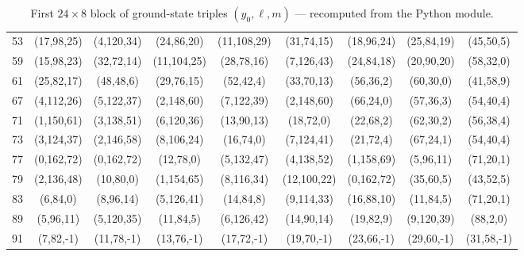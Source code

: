 \documentclass[11pt,a4paper]{article}
\begin{document}
\begin{table}[htbp]
\begin{tabular}{c|cccccccc}
53 & (17,98,25) & (4,120,34) & (24,86,20) & (11,108,29) & (31,74,15) & (18,96,24) & (25,84,19) & (45,50,5) \\
59 & (15,98,23) & (32,72,14) & (11,104,25) & (28,78,16) & (7,126,43) & (24,84,18) & (20,90,20) & (58,32,0) \\
61 & (25,82,17) & (48,48,6) & (29,76,15) & (52,42,4) & (33,70,13) & (56,36,2) & (60,30,0) & (41,58,9) \\
67 & (4,112,26) & (5,122,37) & (2,148,60) & (7,122,39) & (2,148,60) & (66,24,0) & (57,36,3) & (54,40,4) \\
71 & (1,150,61) & (3,138,51) & (6,120,36) & (13,90,13) & (18,72,0) & (22,68,2) & (62,30,2) & (56,38,4) \\
73 & (3,124,37) & (2,146,58) & (8,106,24) & (16,74,0) & (7,124,41) & (21,72,4) & (67,24,1) & (54,40,4) \\
77 & (0,162,72) & (0,162,72) & (12,78,0) & (5,132,47) & (4,138,52) & (1,158,69) & (5,96,11) & (71,20,1) \\
79 & (2,136,48) & (10,80,0) & (1,154,65) & (8,116,34) & (12,100,22) & (0,162,72) & (35,60,5) & (43,52,5) \\
83 & (6,84,0) & (8,96,14) & (5,126,41) & (14,84,8) & (9,114,33) & (16,88,10) & (11,84,5) & (71,20,1) \\
89 & (5,96,11) & (5,120,35) & (11,84,5) & (6,126,42) & (14,90,14) & (19,82,9) & (9,120,39) & (88,2,0) \\
91 & (7,82,-1) & (11,78,-1) & (13,76,-1) & (17,72,-1) & (19,70,-1) & (23,66,-1) & (29,60,-1) & (31,58,-1) \\
\end{tabular}
\caption{First \(24 \times 8\) block of ground-state triples \((y_0, \ell, m)\) — recomputed from the Python module.}
\label{tab:ym-block1-recomputed}
\end{table}
\end{document}
